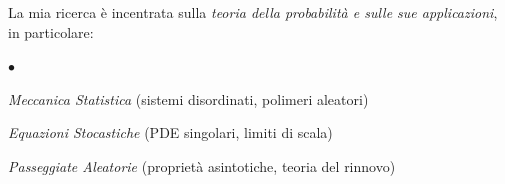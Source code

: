 \documentclass[a4paper,11pt,oneside]{amsart}
\newenvironment{myitemize}{%
\begin{list}{$\bullet$}%
 	{%
	\setlength{\itemsep}{0.3em}%
	\setlength{\topsep}{0.3em}%
	\setlength{\partopsep}{0em}%
	\setlength{\parsep}{0em}%
	\setlength{\parskip}{0em}%
	\setlength\leftmargin{1.5em}%
	\setlength\labelwidth{1.1em}%
	\setlength{\labelsep}{0.4em}%
	}%
	}%
{\end{list}}
\renewenvironment{itemize}{
\begin{myitemize}}%
{\end{myitemize}}
\begin{document}
La mia ricerca è incentrata sulla \emph{teoria della probabilità 
e sulle sue applicazioni}, in particolare:
\begin{itemize}
\item \emph{Meccanica Statistica}
(sistemi disordinati, polimeri aleatori)
\item \emph{Equazioni Stocastiche}
(PDE singolari, limiti di scala)
\item \emph{Passeggiate Aleatorie}
(proprietà asintotiche, teoria del rinnovo)
\end{itemize}

\end{document}
